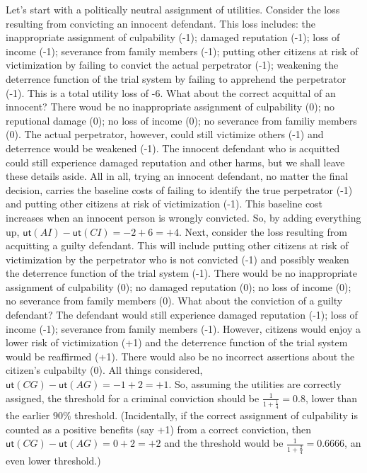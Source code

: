 \documentclass[
  10pt,
  dvipsnames,enabledeprecatedfontcommands]{scrartcl}
\newcommand{\ut}{\mathsf{ut}}
\begin{document}
Let's start with a politically neutral assignment of utilities. Consider
the loss resulting from convicting an innocent defendant. This loss
includes: the inappropriate assignment of culpability (-1); damaged
reputation (-1); loss of income (-1); severance from family members
(-1); putting other citizens at risk of victimization by failing to
convict the actual perpetrator (-1); weakening the deterrence function
of the trial system by failing to apprehend the perpetrator (-1). This
is a total utility loss of -6. What about the correct acquittal of an
innocent? There woud be no inappropriate assignment of culpability (0);
no reputional damage (0); no loss of income (0); no severance from
familiy members (0). The actual perpetrator, however, could still
victimize others (-1) and deterrence would be weakened (-1). The
innocent defendant who is acquitted could still experience damaged
reputation and other harms, but we shall leave these details aside. All
in all, trying an innocent defendant, no matter the final decision,
carries the baseline costs of failing to identify the true perpetrator
(-1) and putting other citizens at risk of victimization (-1). This
baseline cost increases when an innocent person is wrongly convicted.
So, by adding everything up, \(\ut(AI)-\ut(CI)=-2+6=+4\). Next, consider
the loss resulting from acquitting a guilty defendant. This will include
putting other citizens at risk of victimization by the perpetrator who
is not convicted (-1) and possibly weaken the deterrence function of the
trial system (-1). There would be no inappropriate assignment of
culpability (0); no damaged reputation (0); no loss of income (0); no
severance from family members (0). What about the conviction of a guilty
defendant? The defendant would still experience damaged reputation (-1);
loss of income (-1); severance from family members (-1). However,
citizens would enjoy a lower risk of victimization (+1) and the
deterrence function of the trial system would be reaffirmed (+1). There
would also be no incorrect assertions about the citizen's culpabilty
(0). All things considered, \(\ut(CG)-\ut(AG)=-1+2=+1\). So, assuming
the utilities are correctly assigned, the threshold for a criminal
conviction should be \(\frac{1}{1+\frac{1}{4}}=0.8\), lower than the
earlier \(90\%\) threshold. (Incidentally, if the correct assignment of
culpability is counted as a positive benefits (say +1) from a correct
conviction, then \(\ut(CG)-\ut(AG)=0+2=+2\) and the threshold would be
\(\frac{1}{1+\frac{2}{4}}=0.6666\), an even lower threshold.)
\end{document}
